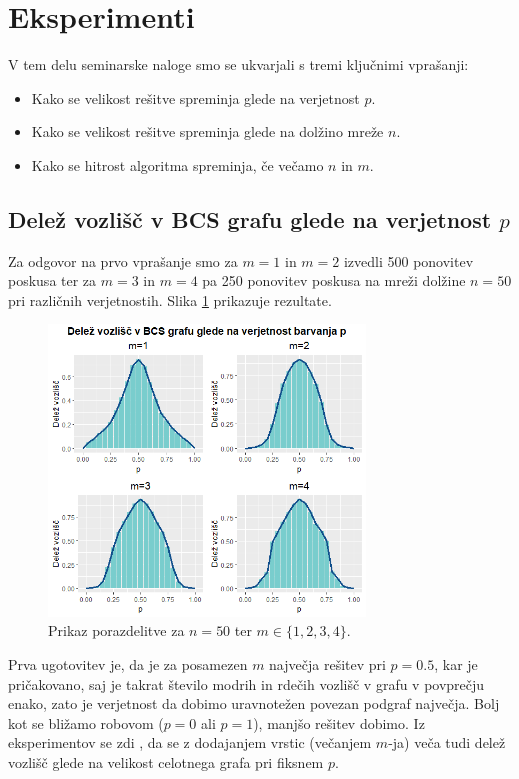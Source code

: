 \documentclass[a4paper, 11pt]{article}
\theoremstyle{definition}
\theoremstyle{definition}
\begin{document}
\section{Eksperimenti}


V tem delu seminarske naloge smo se ukvarjali s tremi ključnimi vprašanji:
    
\begin{itemize}
\item 
Kako se velikost rešitve spreminja glede na verjetnost $p$.
\item
Kako se velikost rešitve spreminja glede na dolžino mreže $n$.
\item 
Kako se hitrost algoritma spreminja, če večamo $n$ in $m$.
\end{itemize}

\subsection{Delež vozlišč v BCS grafu glede na verjetnost $p$} 

Za odgovor na prvo vprašanje smo za $m=1$ in $m=2$ izvedli 500 ponovitev 
poskusa ter za $m=3$ in $m=4$ pa 250 ponovitev poskusa na mreži dolžine $n=50$ pri različnih verjetnostih. 
Slika \ref{fig:verj} prikazuje rezultate.

\begin{figure}[ht!]
    \centering
    \includegraphics[width=0.75\textwidth]{verj.png}
    \caption{Prikaz porazdelitve za $n=50$ ter $m \in \{ 1,2,3,4 \}$.}
    \label{fig:verj}
\end{figure}

Prva ugotovitev je, da je za posamezen $m$  največja rešitev pri $p=0.5$, 
kar je pričakovano, saj je takrat število modrih in rdečih vozlišč v 
grafu v povprečju enako, zato je verjetnost da dobimo uravnotežen povezan 
podgraf največja. 
Bolj kot se bližamo robovom ($p=0$ ali $p=1$), manjšo rešitev dobimo. 
Iz eksperimentov se zdi 
, da se z dodajanjem vrstic (večanjem $m$-ja) veča tudi delež vozlišč glede 
na velikost celotnega grafa pri fiksnem $p$.
\end{document}
